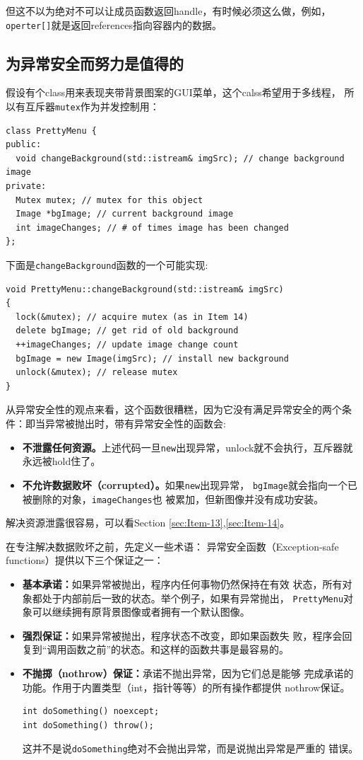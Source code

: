 但这不以为绝对不可以让成员函数返回handle，有时候必须这么做，例如，
\texttt{operter[]}就是返回references指向容器内的数据。

\subsection{为异常安全而努力是值得的}
\label{sec:Item-29}

假设有个class用来表现夹带背景图案的GUI菜单，这个calss希望用于多线程，
所以有互斥器\texttt{mutex}作为并发控制用：
\begin{verbatim}
class PrettyMenu {
public:
  void changeBackground(std::istream& imgSrc); // change background image
private:
  Mutex mutex; // mutex for this object
  Image *bgImage; // current background image
  int imageChanges; // # of times image has been changed
};
\end{verbatim}
下面是\texttt{changeBackground}函数的一个可能实现:
\begin{verbatim}
void PrettyMenu::changeBackground(std::istream& imgSrc)
{
  lock(&mutex); // acquire mutex (as in Item 14)
  delete bgImage; // get rid of old background
  ++imageChanges; // update image change count
  bgImage = new Image(imgSrc); // install new background
  unlock(&mutex); // release mutex
}
\end{verbatim}
从异常安全性的观点来看，这个函数很糟糕，因为它没有满足异常安全的两个条
件：即当异常被抛出时，带有异常安全性的函数会:
\begin{itemize}
\item \textbf{不泄露任何资源。}上述代码一旦\texttt{new}出现异常，unlock就不会执行，互斥器就
  永远被hold住了。
\item \textbf{不允许数据败坏（corrupted）。}如果\texttt{new}出现异常，
  \texttt{bgImage}就会指向一个已被删除的对象，\texttt{imageChanges}也
  被累加，但新图像并没有成功安装。
\end{itemize}

解决资源泄露很容易，可以看Section \ref{sec:Item-13},\ref{sec:Item-14}。

在专注解决数据败坏之前，先定义一些术语：
异常安全函数（Exception-safe functions）提供以下三个保证之一：
\begin{itemize}
\item \textbf{基本承诺：}如果异常被抛出，程序内任何事物仍然保持在有效
  状态，所有对象都处于内部前后一致的状态。举个例子，如果有异常抛出，
  \texttt{PrettyMenu}对象可以继续拥有原背景图像或者拥有一个默认图像。
\item \textbf{强烈保证：}如果异常被抛出，程序状态不改变，即如果函数失
  败，程序会回复到“调用函数之前”的状态。和这样的函数共事是最容易的。
\item \textbf{不抛掷（nothrow）保证：}承诺不抛出异常，因为它们总是能够
  完成承诺的功能。作用于内置类型（int，指针等等）的所有操作都提供
  nothrow保证。
\begin{verbatim}
int doSomething() noexcept;
int doSomething() throw();
\end{verbatim}
这并不是说\texttt{doSomething}绝对不会抛出异常，而是说抛出异常是严重的
错误。
\end{itemize}

